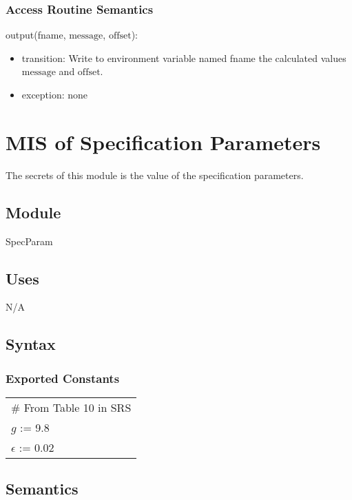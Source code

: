 \documentclass[12pt, titlepage]{article}
\begin{document}
\subsubsection{Access Routine Semantics}

\noindent output(fname, $\text{message}$, $\text{offset}$):
\begin{itemize}
\item transition:  Write to environment variable named fname the calculated values $\text{message}$ and $\text{offset}$.
\item exception: none
\end{itemize}

\newpage

\section{MIS of Specification Parameters} \label{SpecParam}

The secrets of this module is the value of the specification parameters.

\subsection{Module}

SpecParam

\subsection{Uses}

N/A

\subsection{Syntax}

\subsubsection{Exported Constants}

\renewcommand{\arraystretch}{1.2}
\begin{longtable*}[l]{l} 
\# From Table 10 in SRS\\
  $g$ := 9.8\\
  $\epsilon$ := 0.02\\
\end{longtable*}

\subsection{Semantics}
\end{document}
